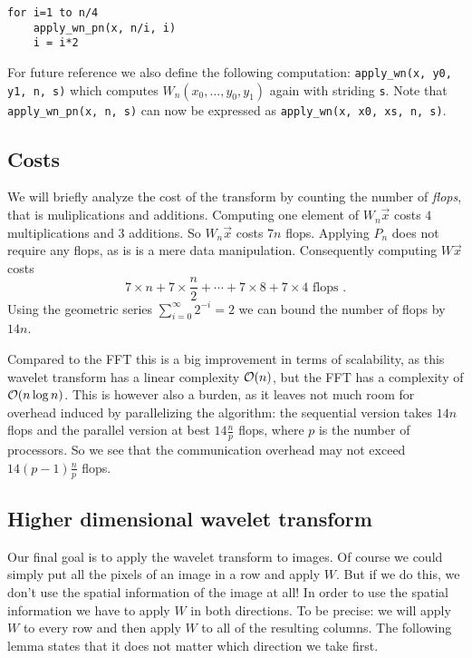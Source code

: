 \begin{lstlisting}
for i=1 to n/4
	apply_wn_pn(x, n/i, i)
	i = i*2
\end{lstlisting}

For future reference we also define the following computation: \texttt{apply\_wn(x, y0, y1, n, s)} which computes $W_n (x_0, \ldots, y_0, y_1)$ again with striding \texttt{s}. Note that \texttt{apply\_wn\_pn(x, n, s)} can now be expressed as \texttt{apply\_wn(x, x0, xs, n, s)}.


\subsection{Costs}
We will briefly analyze the cost of the transform by counting the number of \emph{flops}, that is muliplications and additions. Computing one element of $W_n \vec{x}$ costs $4$ multiplications and $3$ additions. So $W_n \vec{x}$ costs $7n$ flops. Applying  $P_n$ does not require any flops, as is is a mere data manipulation. Consequently computing $W \vec{x}$ costs
\[ 7 \times n + 7 \times \frac{n}{2} + \cdots +  7 \times 8 + 7 \times 4 \text{ flops }. \]
Using the geometric series $\sum_{i=0}^\infty 2^{-i} = 2$ we can bound the number of flops by $14n$.

Compared to the FFT this is a big improvement in terms of scalability, as this wavelet transform has a linear complexity $\mathcal{O}(n)$, but the FFT has a complexity of $\mathcal{O}(n \log n)$. This is however also a burden, as it leaves not much room for overhead induced by parallelizing the algorithm: the sequential version takes $14n$ flops and the parallel version at best $14\frac{n}{p}$ flops, where $p$ is the number of processors. So we see that the communication overhead may not exceed $14(p-1)\frac{n}{p}$ flops.


\subsection{Higher dimensional wavelet transform}
Our final goal is to apply the wavelet transform to images. Of course we could simply put all the pixels of an image in a row and apply $W$. But if we do this, we don't use the spatial information of the image at all! In order to use the spatial information we have to apply $W$ in both directions. To be precise: we will apply $W$ to every row and then apply $W$ to all of the resulting columns. The following lemma states that it does not matter which direction we take first.

